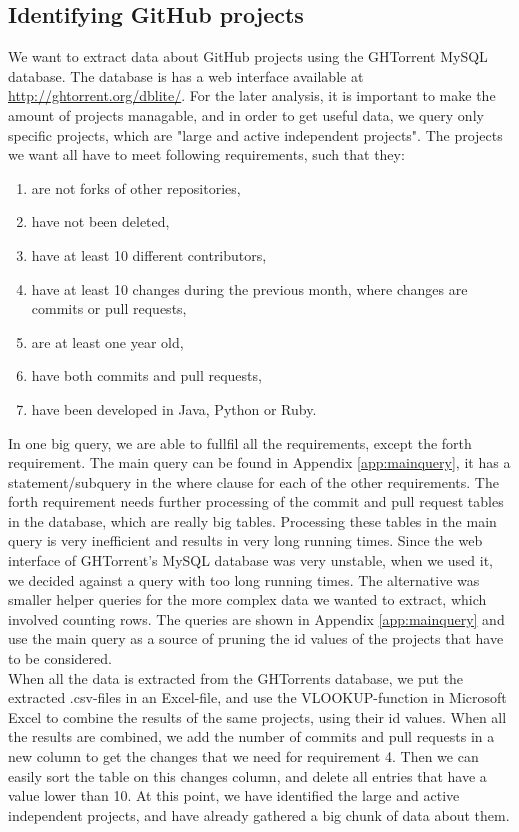\documentclass[a4paper,11pt]{article}
\begin{document}
		\subsection{Identifying GitHub projects}
			We want to extract data about GitHub projects using the GHTorrent MySQL database. The database is has a web interface available at \url{http://ghtorrent.org/dblite/}. For the later analysis, it is important to make the amount of projects managable, and in order to get useful data, we query only specific projects, which are "large and active independent projects". The projects we want all have to meet following requirements, such that they:

			\begin{enumerate}
				\item are not forks of other repositories,
				\item have not been deleted,
				\item have at least 10 different contributors,
				\item have at least 10 changes during the previous month, where changes are commits or pull requests,
				\item are at least one year old,
				\item have both commits and pull requests,
				\item have been developed in Java, Python or Ruby.
			\end{enumerate}
	
			In one big query, we are able to fullfil all the requirements, except the forth requirement. 
			The main query can be	found in Appendix \ref{app:mainquery}, it has a statement/subquery in the where clause for each of the other requirements. 
			The forth requirement needs further processing of the commit and pull request tables in the database, which are really big tables. 
			Processing these tables in the main query is very inefficient and results in very long running times. 
			Since the web interface of GHTorrent's MySQL database was very unstable, when we used it, we decided against a query with too long running times. 
			The alternative was smaller helper queries for the more complex data we wanted to extract, which involved counting rows. 
			The queries are shown in Appendix \ref{app:mainquery} and use the main query as a source of pruning the id values of the projects that have to be considered.\\

			When all the data is extracted from the GHTorrents database, we put the extracted .csv-files in an Excel-file, and use the VLOOKUP-function in Microsoft Excel to combine the results of the same projects, using their id values. When all the results are combined, we add the number of commits and pull requests in a new column to get the changes that we need for requirement 4. Then we can easily sort the table on this changes column, and delete all entries that have a value lower than 10. At this point, we have identified the large and active independent projects, and have already gathered a big chunk of data about them.
\end{document}
